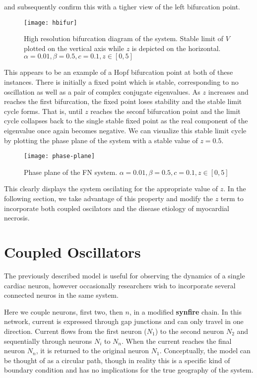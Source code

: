 \documentclass[11pt]{report}
\begin{document}
and subsequently confirm this with a tigher view of the left bifurcation point.

\begin{figure}[!ht]
  \caption{High resolution bifurcation diagram of the system. Stable limit of $V$ plotted on the vertical axis while $z$ is depicted on the horizontal. $\alpha = 0.01, \beta = 0.5,c = 0.1,z \in [0,5]$ }
  \centering
    \texttt{[image: hbifur]}
\end{figure}


This appears to be an example of a Hopf bifurcation point at both of these instances. There is initially a fixed point which is stable, corresponding to no oscillation as well as a pair of complex conjugate eigenvalues. As $z$ increases and reaches the first bifurcation, the fixed point loses stability and the stable limit cycle forms. That is, until $z$ reaches the seconf bifurcation point and the limit cycle collapses back to the single stable fixed point as the real component of the eigenvalue once again becomes negative. We can visualize this stable limit cycle by plotting the phase plane of the system with a stable value of $z = 0.5$.

\begin{figure}[!ht]
  \caption{Phase plane of the FN system. $\alpha = 0.01, \beta = 0.5,c = 0.1,z \in [0,5]$ }
  \centering
    \texttt{[image: phase-plane]}
\end{figure}

This clearly displays the system oscilating for the appropriate value of $z$. In the following section, we take advantage of this property and modify the $z$ term to incorporate both coupled oscilators and the disease etiology of myocardial necrosis. 




\section{Coupled Oscillators} %
\label{sub:coupled_oscillators}

The previously described model is useful for observing the dynamics of a single cardiac neuron, however occasionally researchers wish to incorporate several connected neuros in the same system. 

Here we couple neurons, first two, then $n$, in a modified \textbf{synfire} chain. In this network, current is expressed through gap junctions and can only travel in one direction. Current flows from the first neuron ($N_1$) to the second neuron $N_2$ and sequentially through neurons $N_i$ to $N_n$. When the current reaches the final neuron $N_n$, it is returned to the original neuron $N_1$. Conceptually, the model can be thought of as a circular path, though in reality this is a specific kind of boundary condition and has no implications for the true geography of the system. 
\end{document}
